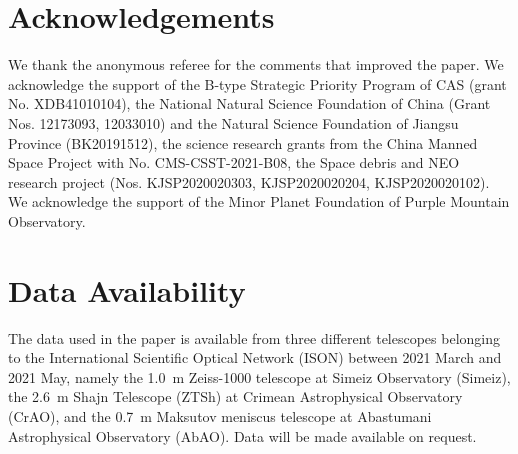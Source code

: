 \documentclass[fleqn,usenatbib]{mnras}
\begin{document}










% 


\section*{Acknowledgements}

We thank the anonymous referee for the comments that improved the paper. We acknowledge the support of  the B-type Strategic Priority Program of CAS (grant No. XDB41010104), the National Natural Science Foundation of China (Grant Nos. 12173093, 12033010) and the Natural Science Foundation of Jiangsu Province (BK20191512), the science research grants from the China Manned Space Project with No. CMS-CSST-2021-B08, the Space debris and NEO research project (Nos. KJSP2020020303, KJSP2020020204, KJSP2020020102). We acknowledge the support of the Minor Planet Foundation of Purple Mountain Observatory. 

\section*{Data Availability}

The data used in the paper is available from three different telescopes belonging to the International Scientific Optical Network (ISON) between 2021 March and 2021 May, namely the \qty{1.0}{\m} Zeiss-1000 telescope at Simeiz Observatory (Simeiz), the \qty{2.6}{\m} Shajn Telescope (ZTSh) at Crimean Astrophysical Observatory (CrAO), and the \qty{0.7}{\m} Maksutov meniscus telescope at Abastumani Astrophysical Observatory (AbAO). Data will be made available on request. 




 


\end{document}

